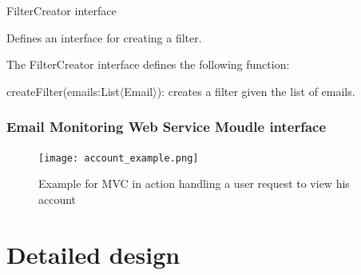 \begin{my_itemize}
  \item FilterCreator interface
  \begin{my_desc}
   \item[Purpose] Defines an interface for creating a filter.
   \item[Function] The FilterCreator interface defines the following function:
	\begin{my_itemize}
	\item createFilter(emails:List$\langle$Email$\rangle$): creates a filter given the list of emails.
	\end{my_itemize}
  \end{my_desc}

\end{my_itemize}
\subsubsection{Email Monitoring Web Service Moudle interface}
\begin{figure}[H]
  \centering
  \texttt{[image: account\_example.png]}
  \caption[Example for MVC in action handling a user request to view his account]{Example for MVC in action handling a user request to view his account}
\end{figure}


\section{Detailed design}
